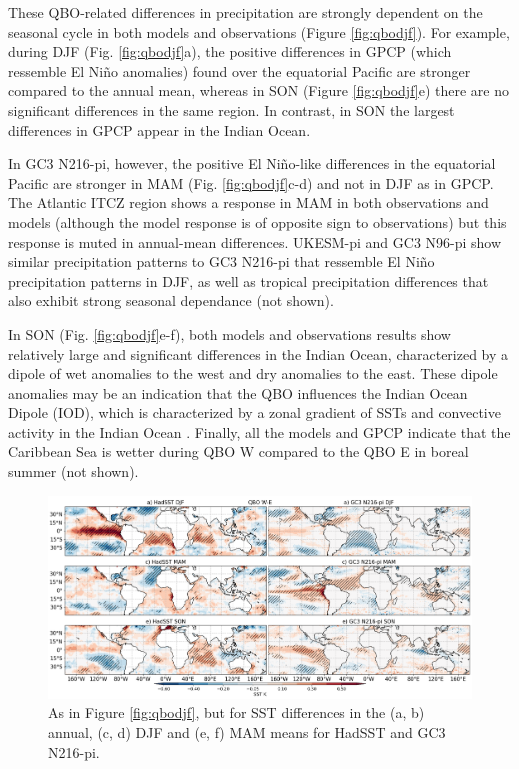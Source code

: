 These QBO-related differences in precipitation are strongly dependent on the seasonal cycle in both models and observations (Figure \ref{fig:qbodjf}). 
For example, during DJF (Fig. \ref{fig:qbodjf}a), the positive differences in GPCP (which ressemble El Niño anomalies) found over the equatorial Pacific are stronger  compared to the annual mean, whereas in SON (Figure \ref{fig:qbodjf}e) there are no significant differences in the same region. In contrast, in SON the largest differences in GPCP appear in the Indian Ocean.

In GC3 N216-pi, however, the positive El Niño-like differences in the equatorial Pacific are stronger in MAM (Fig. \ref{fig:qbodjf}c-d) and not in DJF as in GPCP. The Atlantic ITCZ region shows a response in MAM in both observations and models (although the model response is of opposite sign to observations) but this response is muted in annual-mean differences. 
 UKESM-pi and GC3 N96-pi show similar precipitation patterns to GC3 N216-pi that ressemble El Niño precipitation patterns in DJF, as well as tropical precipitation differences that also exhibit strong seasonal dependance (not shown).

In SON (Fig. \ref{fig:qbodjf}e-f), both models and observations results show relatively large and significant differences in the Indian Ocean, characterized by a dipole of wet anomalies to the west and dry anomalies to the east. These dipole anomalies may be an indication that the QBO influences the Indian Ocean Dipole (IOD), which is characterized by a zonal gradient of SSTs and convective activity in the Indian Ocean \citep{saji1999iod,deser2010sea,mckenna2020iod}. 
Finally, all the models and GPCP indicate that the Caribbean Sea is wetter during QBO W compared to the QBO E in boreal summer (not shown). 

\begin{figure}[t!]
\centering
 \includegraphics[width=\linewidth]{figures/papersstqbowqboe.png}
\caption[Annual mean SST difference QBO W-E under different QBO phases.]{ As in Figure \ref{fig:qbodjf}, but for SST differences in the (a, b) annual, (c, d) DJF and (e, f) MAM means for HadSST and GC3 N216-pi.}
\label{fig:sstclim}
\end{figure}

